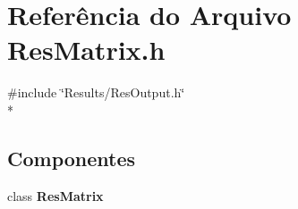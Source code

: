 \section{Referência do Arquivo Res\+Matrix.\+h}
\label{_res_matrix_8h}
{\ttfamily \#include \char`\"{}Results/\+Res\+Output.\+h\char`\"{}}\\*
\subsection*{Componentes}
\begin{DoxyCompactItemize}
\item 
class {\bf Res\+Matrix}
\end{DoxyCompactItemize}
